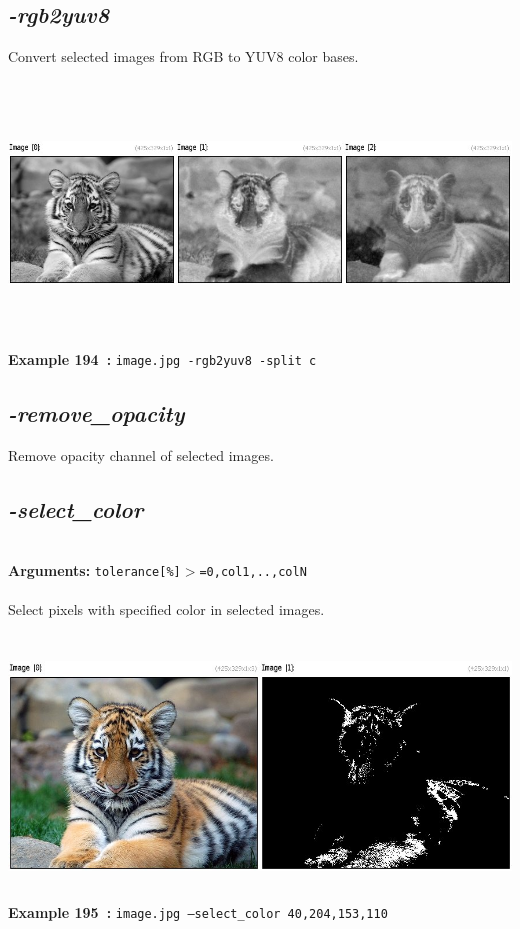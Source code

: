 \documentclass[a4paper,11pt,twoside]{book}
\begin{document}
\subsection{\emph{-rgb2yuv8} }\vspace*{-0.5em}
Convert selected images from RGB to YUV8 color bases.
\begin{center}\includegraphics[keepaspectratio=true,height=7cm,width=\textwidth]{img/gmic_def194.jpg}\\
{\footnotesize \textbf{Example 194~:} \texttt{image.jpg -rgb2yuv8 -split c}}
\end{center}

\subsection{\emph{-remove\_opacity} }\vspace*{-0.5em}
Remove opacity channel of selected images.


\subsection{\emph{-select\_color} }\vspace*{-0.5em}
~\\\textbf{Arguments: } 
{\small \texttt{tolerance[\%]$>$=0,col1,..,colN}}\\~\\
Select pixels with specified color in selected images.
\begin{center}\includegraphics[keepaspectratio=true,height=7cm,width=\textwidth]{img/gmic_def195.jpg}\\
{\footnotesize \textbf{Example 195~:} \texttt{image.jpg --select\_color 40,204,153,110}}
\end{center}
\end{document}

